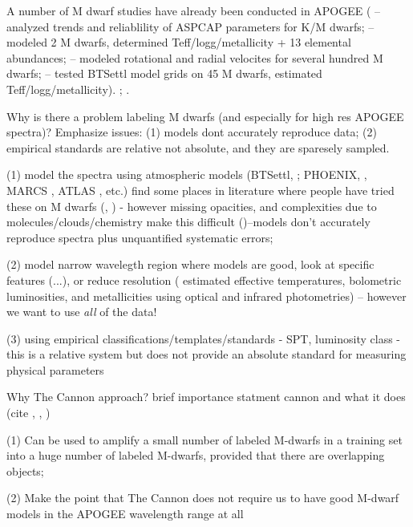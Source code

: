 \documentclass[modern]{aastex62}
\begin{document}
A number of M dwarf studies have already been conducted in APOGEE (\citealt{Schmidt:2016} -- analyzed trends and reliablility of ASPCAP parameters for K/M dwarfs; \citealt{Souto:2017} -- modeled 2 M dwarfs, determined Teff/logg/metallicity + 13 elemental abundances; \citealt{Desphande:2013} -- modeled rotational and radial velocites for several hundred M dwarfs; \citealt{Rajpurohit:2018} -- tested BTSettl model grids on 45 M dwarfs, estimated Teff/logg/metallicity). \citealt{Gilhool:2018}; \citealt{Skinner:2018}.

Why is there a problem labeling M dwarfs (and especially for high res APOGEE spectra)? Emphasize issues: (1) models dont accurately reproduce data; (2) empirical standards are relative not absolute, and they are sparesely sampled. 

 (1) model the spectra using atmospheric models (BTSettl, \citealt{Allard:2011}; PHOENIX, \citealt{Husser:2013}, MARCS \citealt{Gustafsson:2008}, ATLAS \citealt{Castelli:2004}, etc.) find some places in literature where people have tried these on M dwarfs (\citealt{Rajpurohit:2014}, \citealt{Rajpurohit:2018}) - however missing opacities, and complexities due to molecules/clouds/chemistry make this difficult (\citealt{Allard:2013})--models don't accurately reproduce spectra plus unquantified systematic errors; 

 (2) model narrow wavelegth region where models are good, look at specific features (\citealt{Rojas-Ayala:2012}...), or reduce resolution (\citealt{Casagrande:2008} estimated effective temperatures, bolometric luminosities, and metallicities using optical and infrared photometries) -- however we want to use \emph{all} of the data!

 (3) using empirical classifications/templates/standards - SPT, luminosity class - this is a relative system but does not provide an absolute standard for measuring physical parameters

Why The Cannon approach? brief importance statment cannon and what it does (cite \citealt{Ness:2015}, \citealt{Ho:2017a}, \citealt{Casey:2016}) \color{gcolor}{For Hogg to articulate...}\color{black}

 (1) Can be used to amplify a small number of labeled M-dwarfs in a training set into a huge number of labeled M-dwarfs, provided that there are overlapping objects; 

 (2) Make the point that The Cannon does not require us to have good M-dwarf models in the APOGEE wavelength range at all 
\end{document}
